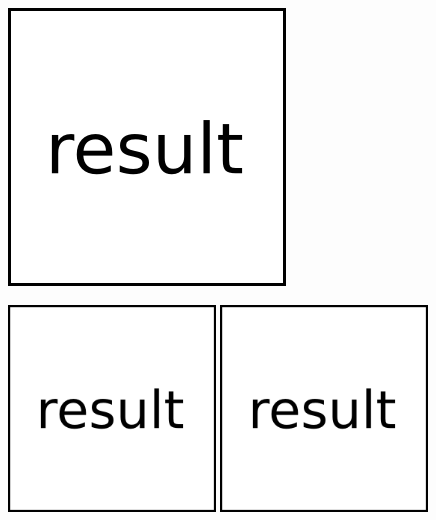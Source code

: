 \documentclass[a1]{sciposter}
\begin{document}
\begin{multicols}{3}
\begin{figure}
	\includegraphics[width=\textwidth]{fig/result.png}
\end{figure}
%
\lipsum[1]
%
\begin{figure}
	\includegraphics[width=0.49\textwidth]{fig/result.png}
	\includegraphics[width=0.49\textwidth]{fig/result.png}

\end{figure}
\end{multicols}
\end{document}
